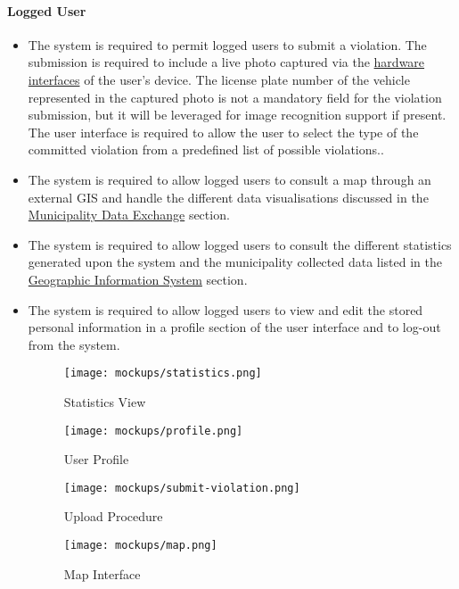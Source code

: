 \newpage\paragraph{Logged User}
	\begin{itemize}
		\item The system is required to permit logged users to submit a violation. The submission is required to include a live photo captured via the \hyperref[sec:hardwareinterfaces]{hardware interfaces} of the user's device. The license plate number of the vehicle represented in the captured photo is not a mandatory field for the violation submission, but it will be leveraged for image recognition support if present. The user interface is required to allow the user to select the type of the committed violation from a predefined list of possible violations..			
		
		\item The system is required to allow logged users to consult a map through an external GIS and handle the different data visualisations discussed in the \hyperref[p:mde]{Municipality Data Exchange} section.
					 
			
			
		\item The system is required to allow logged users to consult the different statistics generated upon the system and the municipality collected data listed in the \hyperref[p:mde]{Geographic Information System} section.
		\item The system is required to allow logged users to view and edit the stored personal information in a profile section of the user interface and to log-out from the system. \newline\newline
			
			\begin{figure}[h]
  				\centering
  				\begin{minipage}[b]{0.4\textwidth}
    				\texttt{[image: mockups/statistics.png]}
    					\caption{Statistics View}
  				\end{minipage}
  				\hfill
  				\begin{minipage}[b]{0.4\textwidth}
    				\texttt{[image: mockups/profile.png]}
    				\caption{User Profile}
  				\end{minipage}
			\end{figure}
			
			\begin{figure}[h]
  				\centering
  				\begin{minipage}[b]{0.4\textwidth}
    				\texttt{[image: mockups/submit-violation.png]}
    					\caption{Upload Procedure}
  				\end{minipage}
  				\hfill
  				\begin{minipage}[b]{0.4\textwidth}
    				\texttt{[image: mockups/map.png]}
    				\caption{Map Interface}
  				\end{minipage}
			\end{figure}
	\end{itemize}

